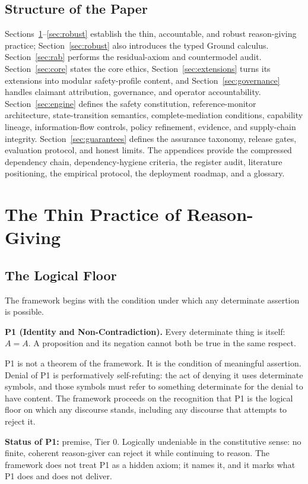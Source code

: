 \documentclass[11pt]{article}
\def\ensuremath#1{#1}%
\def\mathsf#1{#1}%
\newcommand{\Ground}{\ensuremath{\mathsf{Ground}}}
\begin{document}
\subsection{Structure of the Paper}
Sections~\ref{sec:thin}--\ref{sec:robust} establish the thin, accountable, and robust reason-giving practice; Section~\ref{sec:robust} also introduces the typed \Ground{} calculus. Section~\ref{sec:rab} performs the residual-axiom and countermodel audit. Section~\ref{sec:core} states the core ethics, Section~\ref{sec:extensions} turns its extensions into modular safety-profile content, and Section~\ref{sec:governance} handles claimant attribution, governance, and operator accountability. Section~\ref{sec:engine} defines the safety constitution, reference-monitor architecture, state-transition semantics, complete-mediation conditions, capability lineage, information-flow controls, policy refinement, evidence, and supply-chain integrity. Section~\ref{sec:guarantees} defines the assurance taxonomy, release gates, evaluation protocol, and honest limits. The appendices provide the compressed dependency chain, dependency-hygiene criteria, the register audit, literature positioning, the empirical protocol, the deployment roadmap, and a glossary.

\section{The Thin Practice of Reason-Giving}\label{sec:thin}
\subsection{The Logical Floor}
The framework begins with the condition under which any determinate assertion is possible.
\begin{paperbox}
\textbf{P1 (Identity and Non-Contradiction).} Every determinate thing is itself: $A = A$. A proposition and its negation cannot both be true in the same respect.
\end{paperbox}
P1 is not a theorem of the framework. It is the condition of meaningful assertion. Denial of P1 is performatively self-refuting: the act of denying it uses determinate symbols, and those symbols must refer to something determinate for the denial to have content. The framework proceeds on the recognition that P1 is the logical floor on which any discourse stands, including any discourse that attempts to reject it.

\textbf{Status of P1:} premise, Tier 0. Logically undeniable in the constitutive sense: no finite, coherent reason-giver can reject it while continuing to reason. The framework does not treat P1 as a hidden axiom; it names it, and it marks what P1 does and does not deliver.
\end{document}
